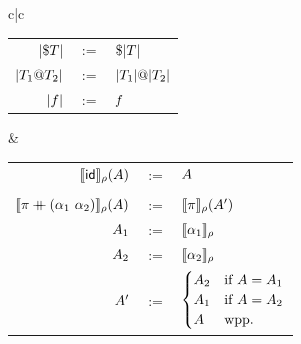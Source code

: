 \documentclass[aspectratio=169]{beamer}
\begin{document}
\begin{frame}
\begin{tabularx}{\textwidth}{c|c}
\begin{tabular}{rcl}
        $|\$ T|             $& $:=$ & $\$ |T|                      $ \\
        $|T_1 @ T_2| $& $:=$ & $|T_1| @ |T_2|$ \\
        $|f|                        $& $:=$ & $f                                           $ \\
      \end{tabular}
      &
      \begin{tabular}{rcl}
      $\llbracket \mathsf{id} \rrbracket_{\rho}(A)                                $ & $:=$ & $A                                                        $ \\ & & \\
      $\permMdl{\perm \++ \swap{\atomexp_1}{\atomexp_2}}{\tmEnv}(\sematom)$ & $:=$ & $\llbracket \pi \rrbracket_{\rho} (A')                             $ \\
        \text{where }$\: A_1$ & $:=$ &  $\llbracket \alpha_1 \rrbracket_{\rho}$ \\
        \text{  and }$\: A_2$ & $:=$ &  $\llbracket \alpha_2 \rrbracket_{\rho}$ \\
        \text{  and }$\: A'$  & $:=$ &
          $\begin{cases}
            A_2 & \text{if } A = A_1 \\
            A_1 & \text{if } A = A_2 \\
            A   & \text{wpp.}
          \end{cases}$
          \\
      \end{tabular}
\end{tabularx}
\end{frame}
\end{document}
